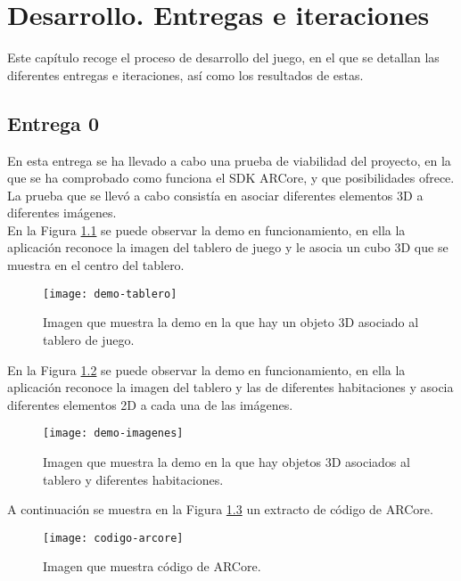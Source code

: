 \chapter{Desarrollo. Entregas e iteraciones}
\label{ch:desarrollo}
Este capítulo recoge el proceso de desarrollo del juego, en el que se detallan las diferentes entregas e iteraciones, así como los resultados de estas.

\section{Entrega 0}
En esta entrega se ha llevado a cabo una prueba de viabilidad del proyecto, en la que se ha comprobado como funciona el SDK ARCore, y que posibilidades ofrece. La prueba que se llevó a cabo consistía en asociar diferentes elementos 3D a diferentes imágenes.\\

En la Figura \ref{figura-demo-tablero} se puede observar la demo en funcionamiento, en ella la aplicación reconoce la imagen del tablero de juego y le asocia un cubo 3D que se muestra en el centro del tablero.

\begin{figure}[h]
  \centering
  \texttt{[image: demo-tablero]}
  \caption{Imagen que muestra la demo en la que hay un objeto 3D asociado al tablero de juego.}
  \label{figura-demo-tablero}
\end{figure}

\newpage
En la Figura \ref{figura-demo-imagenes} se puede observar la demo en funcionamiento, en ella la aplicación reconoce la imagen del tablero y las de diferentes habitaciones y asocia diferentes elementos 2D a cada una de las imágenes.

\begin{figure}[h]
  \centering
  \texttt{[image: demo-imagenes]}
  \caption{Imagen que muestra la demo en la que hay objetos 3D asociados al tablero y diferentes habitaciones.}
  \label{figura-demo-imagenes}
\end{figure}

A continuación se muestra en la Figura \ref{figura-codigo} un extracto de código de ARCore.

\begin{figure}[h]
  \centering
  \texttt{[image: codigo-arcore]}
  \caption{Imagen que muestra código de ARCore.}
  \label{figura-codigo}
\end{figure}

\newpage

